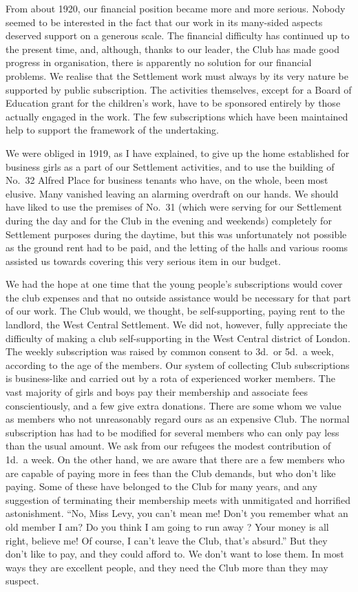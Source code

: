 From about 1920, our financial position became more
and more serious. Nobody seemed to be interested in the
fact that our work in its many-sided aspects deserved support
on a generous scale. The financial difficulty has
continued up to the present time, and, although, thanks
to our leader, the Club has made good progress in organisation,
there is apparently no solution for our financial
problems. We realise that the Settlement work must
always by its very nature be supported by public subscription.
The activities themselves, except for a Board
of Education grant for the children’s work, have to be
sponsored entirely by those actually engaged in the work.
The few subscriptions which have been maintained help
to support the framework of the undertaking.

We were obliged in 1919, as I have explained, to give
up the home established for business girls as a part of our
Settlement activities, and to use the building of No.\ 32
Alfred Place for business tenants who have, on the whole,
been most elusive. Many vanished leaving an alarming
overdraft on our hands. We should have liked to use the
premises of No.\ 31 (which were serving for our Settlement
during the day and for the Club in the evening and weekends)
completely for Settlement purposes during the daytime,
but this was unfortunately not possible as the ground
rent had to be paid, and the letting of the halls and
various rooms assisted us towards covering this very
serious item in our budget.

We had the hope at one time that the young people’s
subscriptions would cover the club expenses and that no
outside assistance would be necessary for that part of our
work. The Club would, we thought, be self-supporting,
paying rent to the landlord, the West Central Settlement.
We did not, however, fully appreciate the difficulty of
making a club self-supporting in the West Central district
of London. The weekly subscription was raised by common
consent to 3d.\ or 5d.\ a week, according to the age
of the members. Our system of collecting Club subscriptions
is business-like and carried out by a rota of experienced
worker members. The vast majority of girls and
boys pay their membership and associate fees conscientiously,
and a few give extra donations. There are
some whom we value as members who not unreasonably
regard ours as an expensive Club. The normal subscription
has had to be modified for several members who can
only pay less than the usual amount. We ask from
our refugees the modest contribution of 1d.\ a week.
On the other hand, we are aware that there are a few
members who are capable of paying more in fees than
the Club demands, but who don’t like paying. Some of
these have belonged to the Club for many years, and any
suggestion of terminating their membership meets with
unmitigated and horrified astonishment. “No, Miss Levy,
you can't mean me! Don’t you remember what an old
member I am? Do you think I am going to run away ?
Your money is all right, believe me! Of course, I can’t
leave the Club, that’s absurd.” But they don’t like to
pay, and they could afford to. We don’t want to lose
them. In most ways they are excellent people, and they
need the Club more than they may suspect.

